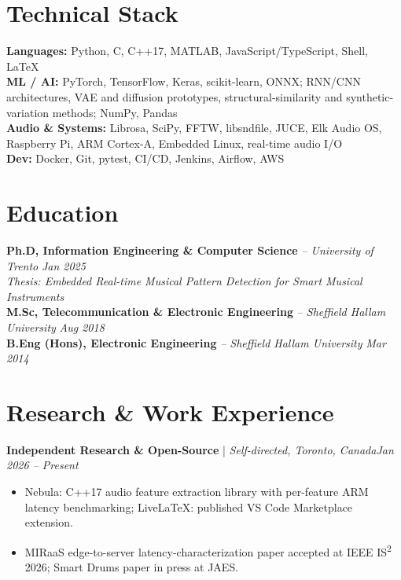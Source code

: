 \documentclass[11pt]{article}
\newenvironment{cvrole}[5]{%
  \par\noindent\textbf{\large #1} | \textit{\small #2, #3}\hfill \textit{\small #4 -- #5}\par
  \begin{itemize}[leftmargin=2em, itemsep=-0.3em, topsep=-0.5em]%
}{%
  \end{itemize}\par\noindent\mbox{}\par\vspace{0.1em}%
}
\begin{document}
\section*{Technical Stack}

\textbf{Languages:} Python, C, C++17, MATLAB, JavaScript/TypeScript, Shell, LaTeX\\
\textbf{ML / AI:} PyTorch, TensorFlow, Keras, scikit-learn, ONNX; RNN/CNN architectures, VAE and diffusion prototypes, structural-similarity and synthetic-variation methods; NumPy, Pandas\\
\textbf{Audio \& Systems:} Librosa, SciPy, FFTW, libsndfile, JUCE, Elk Audio OS, Raspberry Pi, ARM Cortex-A, Embedded Linux, real-time audio I/O\\
\textbf{Dev:} Docker, Git, pytest, CI/CD, Jenkins, Airflow, AWS

\section*{Education}
\textbf{Ph.D, Information Engineering \& Computer Science} \textit{\small{-- University of Trento}} \hfill \textit{Jan 2025}\\[2pt]
\noindent\textit{\small Thesis: Embedded Real-time Musical Pattern Detection for Smart Musical Instruments}\\[3pt]
\noindent\textbf{M.Sc, Telecommunication \& Electronic Engineering} \textit{\small{-- Sheffield Hallam University}} \hfill \textit{Aug 2018}\\[2pt]
\noindent\textbf{B.Eng (Hons), Electronic Engineering} \textit{\small{-- Sheffield Hallam University}} \hfill \textit{Mar 2014}

\section*{Research \& Work Experience}

\begin{cvrole}{Independent Research \& Open-Source}{Self-directed}{Toronto, Canada}{Jan 2026}{Present}
    \item Nebula: C++17 audio feature extraction library with per-feature ARM latency benchmarking; LiveLaTeX: published VS Code Marketplace extension.
    \item MIRaaS edge-to-server latency-characterization paper accepted at IEEE IS\textsuperscript{2} 2026; Smart Drums paper in press at JAES.
\end{cvrole}
\end{document}
